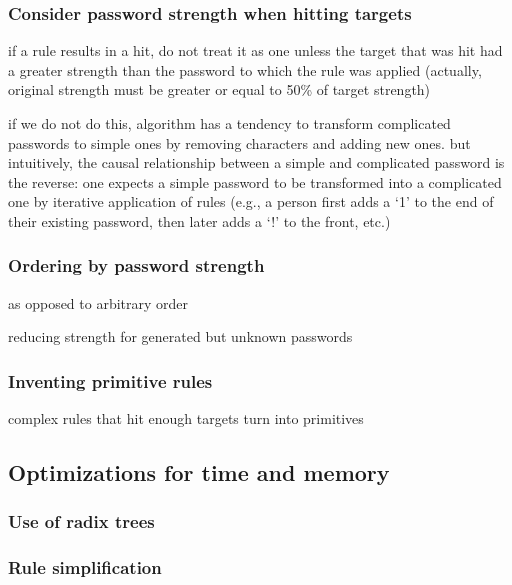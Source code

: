 \documentclass[letterpaper,twocolumn,10pt]{article}
\begin{document}
\subsubsection{Consider password strength when hitting targets}

if a rule results in a hit, do not treat it as one unless the target that was
hit had a greater strength than the password to which the rule was applied
(actually, original strength must be greater or equal to 50\% of target
strength)

if we do not do this, algorithm has a tendency to transform complicated
passwords to simple ones by removing characters and adding new ones. but
intuitively, the causal relationship between a simple and complicated password
is the reverse: one expects a simple password to be transformed into a
complicated one by iterative application of rules (e.g., a person first adds a
`1' to the end of their existing password, then later adds a `!' to the front,
etc.)

\subsubsection{Ordering by password strength}

as opposed to arbitrary order

\cite{bonneau2012statistical}

reducing strength for generated but unknown passwords

\subsubsection{Inventing primitive rules}

complex rules that hit enough targets turn into primitives

\subsection{Optimizations for time and memory}

\subsubsection{Use of radix trees}


\subsubsection{Rule simplification}
\end{document}
